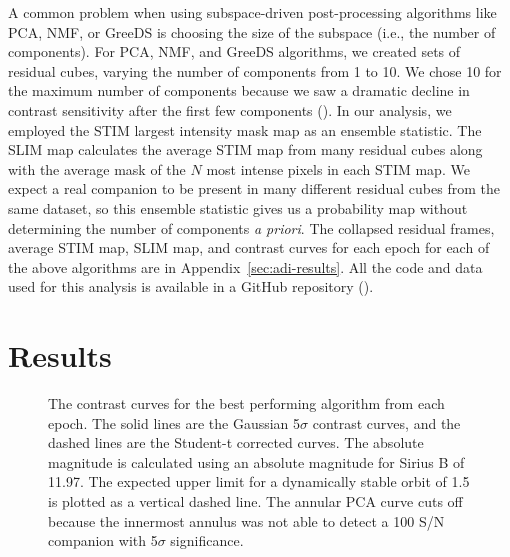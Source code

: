 \documentclass[twocolumn,linenumbers]{aastex631}
\begin{document}
A common problem when using subspace-driven post-processing algorithms like PCA, NMF, or GreeDS is choosing the size of the subspace (i.e., the number of components). For PCA, NMF, and GreeDS algorithms, we created sets of residual cubes, varying the number of components from 1 to 10. We chose 10 for the maximum number of components because we saw a dramatic decline in contrast sensitivity after the first few components (). In our analysis, we employed the STIM largest intensity mask map \citep[SLIM map;][]{pairetSignalProcessingMethods2020} as an ensemble statistic. The SLIM map calculates the average STIM map from many residual cubes along with the average mask of the $N$ most intense pixels in each STIM map. We expect a real companion to be present in many different residual cubes from the same dataset, so this ensemble statistic gives us a probability map without determining the number of components \textit{a priori}. The collapsed residual frames, average STIM map, SLIM map, and contrast curves for each epoch for each of the above algorithms are in Appendix~\ref{sec:adi-results}. All the code and data used for this analysis is available in a GitHub repository ().


\section{Results}\label{sec:results}

\begin{figure*}
    \centering
    \caption{The contrast curves for the best performing algorithm from each epoch. The solid lines are the Gaussian 5$\sigma$ contrast curves, and the dashed lines are the Student-t corrected curves. The absolute magnitude is calculated using an absolute magnitude for Sirius B of 11.97. The expected upper limit for a dynamically stable orbit of \qty{1.5}{\au} is plotted as a vertical dashed line. The annular PCA curve cuts off because the innermost annulus was not able to detect a 100 S/N companion with 5$\sigma$ significance.}
    \label{fig:contrast}
\end{figure*}
\end{document}
